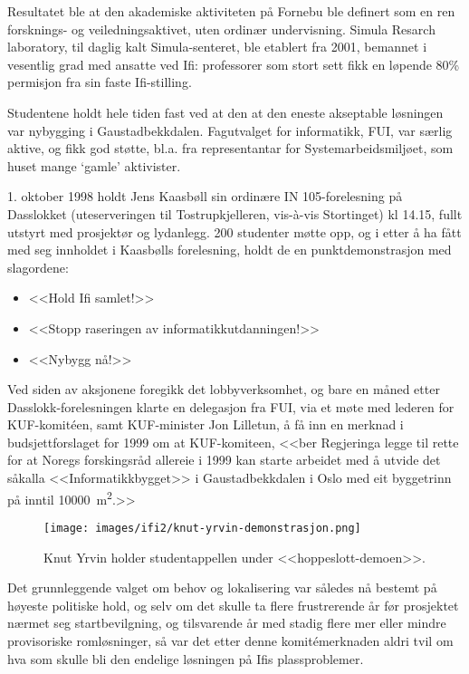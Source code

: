 Resultatet ble at den akademiske aktiviteten på Fornebu ble definert som en ren forsknings- og veiledningsaktivet, uten ordinær undervisning. Simula Resarch laboratory, til daglig kalt Simula-senteret, ble etablert fra 2001, bemannet i vesentlig grad med ansatte ved Ifi: professorer som stort sett fikk en løpende 80\% permisjon fra sin faste Ifi-stilling.

Studentene holdt hele tiden fast ved at den at den eneste akseptable løsningen var nybygging i Gaustadbekkdalen. Fagutvalget for informatikk, FUI, var særlig aktive, og fikk god støtte, bl.a. fra representantar for Systemarbeidsmiljøet, som huset mange `gamle' aktivister.

1. oktober 1998 holdt Jens Kaasbøll sin ordinære IN 105-forelesning på Dasslokket (uteserveringen til Tostrupkjelleren, vis-à-vis Stortinget) kl 14.15, fullt utstyrt med prosjektør og lydanlegg. 200 studenter møtte opp, og i etter å ha fått med seg innholdet i Kaasbølls forelesning, holdt de en punktdemonstrasjon med slagordene:

\begin{itemize}
	\item <<Hold Ifi samlet!>>
	\item <<Stopp raseringen av informatikkutdanningen!>>
	\item <<Nybygg nå!>>
\end{itemize}

Ved siden av aksjonene foregikk det lobbyverksomhet, og bare en måned etter Dasslokk-forelesningen klarte en delegasjon fra FUI, via et møte med lederen for KUF-komitéen, samt KUF-minister Jon Lilletun, å få inn en merknad i budsjettforslaget for 1999 om at KUF-komiteen, <<ber Regjeringa legge til rette for at Noregs forskingsråd allereie i 1999 kan starte arbeidet med å utvide det såkalla <<Informatikkbygget>> i Gaustadbekkdalen i Oslo med eit byggetrinn på inntil \SI{10 000}{\metre\squared}.>>

\begin{wrapfigure}{l}{8cm}
\centering
\texttt{[image: images/ifi2/knut-yrvin-demonstrasjon.png]}
	\caption{Knut Yrvin holder studentappellen under <<hoppeslott-demoen>>.}
\end{wrapfigure}

Det grunnleggende valget om behov og lokalisering var således nå bestemt på høyeste politiske hold, og selv om det skulle ta flere frustrerende år før prosjektet nærmet seg startbevilgning, og tilsvarende år med stadig flere mer eller mindre provisoriske romløsninger, så var det etter denne komitémerknaden aldri tvil om hva som skulle bli den endelige løsningen på Ifis plassproblemer.

